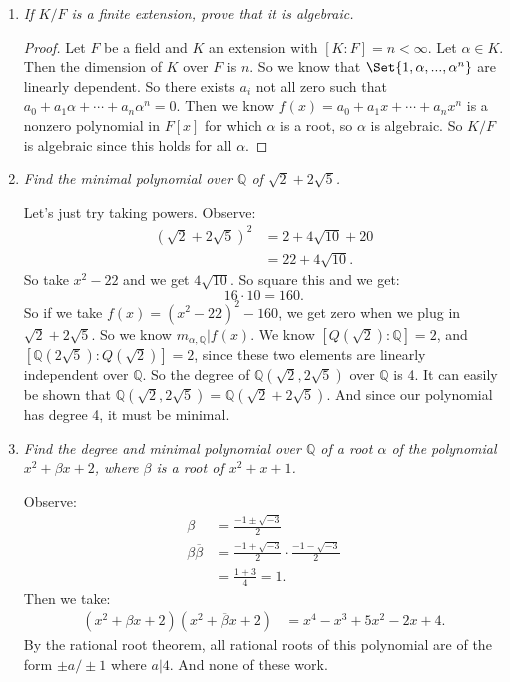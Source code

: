 \documentclass[9pt,reqno,twoside]{amsbook}
\theoremstyle{plain}
\numberwithin{section}{chapter}
\numberwithin{equation}{chapter}
\theoremstyle{definition}
\theoremstyle{remark}
\theoremstyle{plain}
\newcommand{\Q}{\mathbb{Q}}
\newcommand{\bee}{\begin{equation}\begin{aligned}}
\newcommand{\eee}{\end{aligned}\end{equation}}
\newcommand{\fracc}{\frac}
\renewcommand{\bar}{\overline}%
\begin{document}
\begin{enumerate}[label=\arabic*.]
\item \textit{If $K/F$ is a finite extension, prove that it is algebraic. }

\begin{proof}
Let $F$ be a field and $K$ an extension with $[K:F] = n < \infty$. Let $\alpha \in K$. Then the dimension of $K$ over $F$ is $n$. So we know that $\Set{1,\alpha,...,\alpha^n}$ are linearly dependent. So there exists $a_i$ not all zero such that $a_0 + a_1\alpha + \cdots + a_n\alpha^n = 0$. Then we know $f(x) = a_0 + a_1x + \cdots + a_nx^n$ is a nonzero polynomial in $F[x]$ for which $\alpha$ is a root, so $\alpha$ is algebraic. So $K/F$ is algebraic since this holds for all $\alpha$. 
\end{proof}

\item \textit{Find the minimal polynomial over $\Q$ of $\sqrt{2} + 2\sqrt{5}$. }

Let's just try taking powers. Observe:
\bee
(\sqrt{2} + 2\sqrt{5})^2 &=  2 + 4\sqrt{10} + 20\\
&= 22 + 4\sqrt{10}.
\eee
So take $x^2 - 22$ and we get $4\sqrt{10}$. So square this and we get:
$$
16\cdot 10 = 160.
$$
So if we take $f(x) = (x^2 - 22)^2 - 160$, we get zero when we plug in $\sqrt{2} + 2\sqrt{5}$. So we know $m_{\alpha, \Q}|f(x)$. We know $[Q(\sqrt{2}):\Q] = 2$, and $[\Q(2\sqrt{5}):Q(\sqrt{2})] = 2$, since these two elements are linearly independent over $\Q$. So the degree of $\Q(\sqrt{2},2\sqrt{5})$ over $\Q$ is 4. It can easily be shown that $\Q(\sqrt{2},2\sqrt{5}) = \Q(\sqrt{2} + 2\sqrt{5})$. And since our polynomial has degree 4, it must be minimal. 


\item \textit{Find the degree and minimal polynomial over $\Q$ of a root $\alpha$ of the polynomial $x^2 + \beta x + 2$, where $\beta$ is a root of $x^2 + x + 1$. }

Observe:
\bee
\beta &= \fracc{-1 \pm \sqrt{-3}}{2}\\
\beta\bar{\beta} &= \fracc{-1 + \sqrt{-3}}{2}\cdot \fracc{-1 - \sqrt{-3}}{2}\\
&= \fracc{1 + 3}{4} = 1.
\eee
Then we take:
\bee
(x^2 + \beta x + 2)(x^2 + \bar{\beta}x + 2) &= x^4 - x^3  + 5x^2 - 2x + 4.
\eee
By the rational root theorem, all rational roots of this polynomial are of the form $\pm a/\pm 1$ where $a|4$. And none of these work. 






\end{enumerate}
\end{document}
